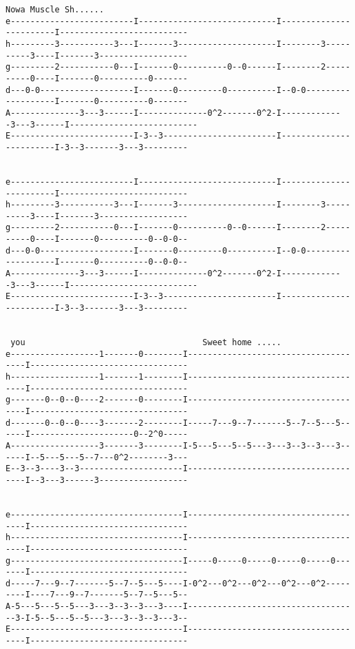 \begin{verbatim}
Nowa Muscle Sh......
e-------------------------I----------------------------I------------------------I--------------------------
h---------3-----------3---I-------3--------------------I--------3----------3----I-------3------------------
g---------2-----------0---I-------0----------0--0------I--------2----------0----I-------0----------0-------
d---0-0-------------------I-------0---------0----------I--0-0-------------------I-------0----------0-------
A--------------3---3------I--------------0^2-------0^2-I-------------3---3------I--------------------------
E-------------------------I-3--3-----------------------I------------------------I-3--3-------3---3---------


e-------------------------I----------------------------I------------------------I--------------------------
h---------3-----------3---I-------3--------------------I--------3----------3----I-------3------------------
g---------2-----------0---I-------0----------0--0------I--------2----------0----I-------0----------0--0-0--
d---0-0-------------------I-------0---------0----------I--0-0-------------------I-------0----------0--0-0--
A--------------3---3------I--------------0^2-------0^2-I-------------3---3------I--------------------------
E-------------------------I-3--3-----------------------I------------------------I-3--3-------3---3---------


 you                                    Sweet home .....
e------------------1-------0--------I-------------------------------------I--------------------------------
h------------------1-------1--------I-------------------------------------I--------------------------------
g-------0--0--0----2-------0--------I-------------------------------------I--------------------------------
d-------0--0--0----3-------2--------I-----7---9--7-------5--7--5---5------I---------------------0--2^0-----
A------------------3-------3--------I-5---5---5--5---3---3--3--3---3------I--5---5---5--7---0^2--------3---
E--3--3----3--3---------------------I-------------------------------------I--3---3------3------------------


e-----------------------------------I-------------------------------------I--------------------------------
h-----------------------------------I-------------------------------------I--------------------------------
g-----------------------------------I-----0-----0-----0-----0-----0-------I--------------------------------
d-----7---9--7-------5--7--5---5----I-0^2---0^2---0^2---0^2---0^2---------I----7---9--7-------5--7--5---5--
A-5---5---5--5---3---3--3--3---3----I-----------------------------------3-I-5--5---5--5---3---3--3--3---3--
E-----------------------------------I-------------------------------------I--------------------------------



\end{verbatim}
